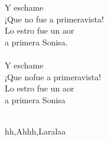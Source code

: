 \begin{cancion}
\begin{chorus}
	Y eschame  \\
	¡Que no fue a primeravista!\\
	Lo estro fue un aor \\
	a primera Sonisa.\\
\jump\\
	Y eschame  \\
	¡Que nofue a primeravista!\\
	Lo estro fue un aor \\
	a primera Sonisa\\
	\end{chorus}%
	\jump\\
	hh,Ahhh,Laralaa           \\
\end{cancion}%
